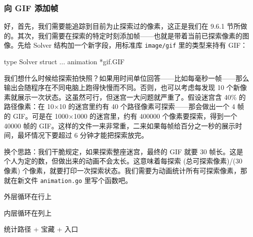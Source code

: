 \subsubsection*{向 GIF 添加帧}

好，首先，我们需要能追踪到目前为止探索过的像素，这正是我们在 9.6.1 节所做的。其次，我们需要在探索的特定时刻添加帧——也就是带着当前已探索像素的图像。先给 Solver 结构加一个新字段，用标准库 \texttt{image/gif} 里的类型来持有 GIF：

\begin{gocode}[]
type Solver struct {
    ...
    animation      *gif.GIF
}
\end{gocode}

我们想什么时候给探索拍快照？如果用时间单位回答——比如每毫秒一帧——那么输出会随程序在不同电脑上跑得快慢而不同。否则，也可以考虑每发现 10 个新像素就展示一次状态。这虽然可行，但迷宫一大问题就严重了。假设迷宫含 40\% 的路径像素：在 10×10 的迷宫里约有 40 个路径像素可探索——那会做出一个 4 帧的 GIF。可是在 1000×1000 的迷宫里，约有 400000 个像素要探索，得到一个 40000 帧的 GIF。这样的文件一来非常重，二来如果每帧给百分之一秒的展示时间，最坏情况下要超过 6 分钟才能把探索放完。

换个思路：我们干脆规定，如果探索整座迷宫，最终的 GIF 就要 30 帧长。这是个人为定的数，但做出来的动画不会太长。这意味着每探索 (总可探索像素)/(30 像素) 个像素，就要打印一次探索状态。我们需要为动画统计所有可探索像素，那就在新文件 \texttt{animation.go} 里写个函数吧。


\begin{codeannotations}
\item 外层循环在行上
\item 内层循环在列上
\item 统计路径 + 宝藏 + 入口
\end{codeannotations}


